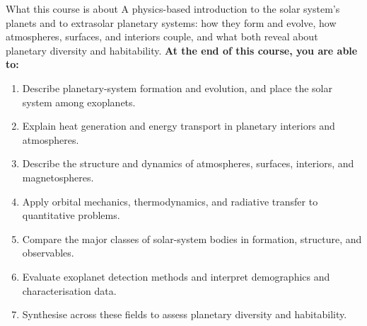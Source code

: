 \documentclass[aspectratio=169, 11pt]{beamer}
\begin{document}
\begin{frame}{What this course is about}
  \small
  A physics-based introduction to the solar system's planets and to extrasolar planetary systems: how they form and evolve, how atmospheres, surfaces, and interiors couple, and what both reveal about planetary diversity and habitability.
  \vskip4pt\relax
  \textbf{At the end of this course, you are able to:}
  {\footnotesize
  \begin{enumerate}
    \item Describe planetary-system formation and evolution, and place the solar system among exoplanets.
    \item Explain heat generation and energy transport in planetary interiors and atmospheres.
    \item Describe the structure and dynamics of atmospheres, surfaces, interiors, and magnetospheres.
    \item Apply orbital mechanics, thermodynamics, and radiative transfer to quantitative problems.
    \item Compare the major classes of solar-system bodies in formation, structure, and observables.
    \item Evaluate exoplanet detection methods and interpret demographics and characterisation data.
    \item Synthesise across these fields to assess planetary diversity and habitability.
  \end{enumerate}}
\end{frame}
\end{document}
